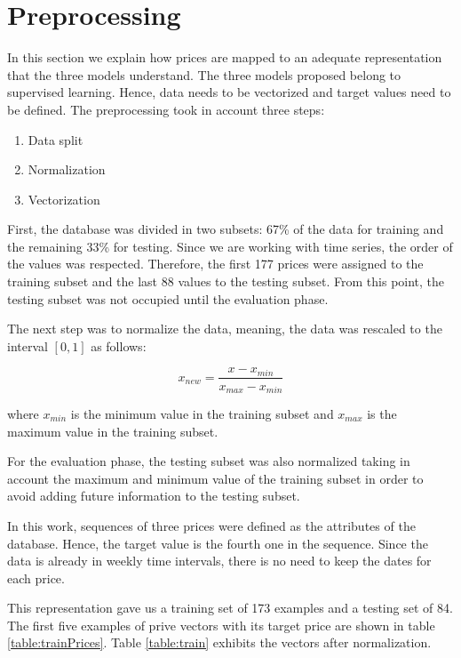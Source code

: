 \section{Preprocessing}
In this section we explain how prices are mapped to an adequate representation that the three models understand. The three models proposed belong to supervised learning. Hence, data needs to be vectorized and target values need to be defined. The preprocessing took in account three steps:

\begin{enumerate}
\item Data split
\item Normalization
\item Vectorization
\end{enumerate}

First, the database was divided in two subsets: 67\% of the data for training and the remaining 33\% for testing. Since we are working with time series, the order of the values was respected. Therefore, the first 177 prices were assigned to the training subset and the last 88 values to the testing subset. From this point, the testing subset was not occupied until the evaluation phase.

The next step was to normalize the data, meaning, the data was rescaled to the interval $[0,1]$ as follows:

\begin{equation}
\label{eq:normalize}
x_{new}=\frac{x-x_{min}}{x_{max}-x_{min}}
\end{equation}

where $x_{min}$ is the minimum value in the training subset and $x_{max}$ is the maximum value in the training subset. 

For the evaluation phase, the testing subset was also normalized taking in account the maximum and minimum value of the training subset in order to avoid adding future information to the testing subset.

In this work, sequences of three prices were defined as the attributes of the database. Hence, the target value is the fourth one in the sequence. Since the data is already in weekly time intervals, there is no need to keep the dates for each price.

This representation gave us a training set of 173 examples and a testing set of 84. The first five examples of prive vectors with its target price are shown in table \ref{table:trainPrices}. Table \ref{table:train} exhibits the vectors after normalization.


